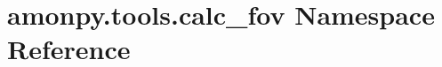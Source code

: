 \hypertarget{namespaceamonpy_1_1tools_1_1calc__fov}{\section{amonpy.\-tools.\-calc\-\_\-fov Namespace Reference}
\label{namespaceamonpy_1_1tools_1_1calc__fov}
}
